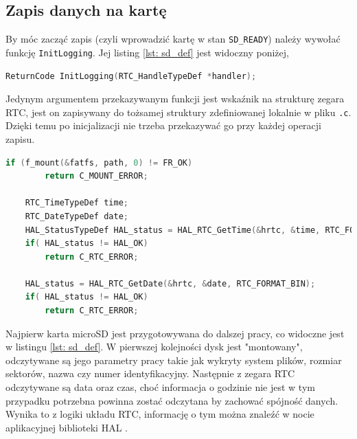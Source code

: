 \subsection{Zapis danych na kartę}
By móc zacząć zapis (czyli wprowadzić kartę w stan \texttt{SD\_READY}) należy wywołać funkcję \texttt{InitLogging}. Jej listing \ref{lst: sd_def} jest widoczny poniżej,

\begin{lstlisting}[language=C,
caption={Definicja funkcji \texttt{InitLogging}},
label = {lst: sd_def}]
    ReturnCode InitLogging(RTC_HandleTypeDef *handler);
\end{lstlisting}
Jedynym argumentem przekazywanym funkcji jest wskaźnik na strukturę zegara RTC, jest on zapisywany do tożsamej struktury zdefiniowanej lokalnie w pliku \texttt{.c}. Dzięki temu po inicjalizacji nie trzeba przekazywać go przy każdej operacji zapisu.
\begin{lstlisting}[language=C,
caption={Odczytywanie czasu z modułu RTC},
label={lst: sd_rtc}]
	if (f_mount(&fatfs, path, 0) != FR_OK)
		return C_MOUNT_ERROR;

    RTC_TimeTypeDef time;
    RTC_DateTypeDef date;
    HAL_StatusTypeDef HAL_status = HAL_RTC_GetTime(&hrtc, &time, RTC_FORMAT_BIN);
    if( HAL_status != HAL_OK)
    	return C_RTC_ERROR;

    HAL_status = HAL_RTC_GetDate(&hrtc, &date, RTC_FORMAT_BIN);
    if( HAL_status != HAL_OK)
		return C_RTC_ERROR;
\end{lstlisting}
Najpierw karta microSD jest przygotowywana do dalszej pracy, co widoczne jest w listingu \ref{lst: sd_def}. W pierwszej kolejności dysk jest "montowany", odczytywane są jego parametry pracy takie jak wykryty system plików, rozmiar sektorów, nazwa czy numer identyfikacyjny. Następnie z zegara RTC odczytywane są data oraz czas, choć informacja o godzinie nie jest w tym przypadku potrzebna powinna zostać odczytana by zachować spójność danych. Wynika to z logiki układu RTC, informację o tym można znaleźć w nocie aplikacyjnej biblioteki HAL \cite{um1725}.

